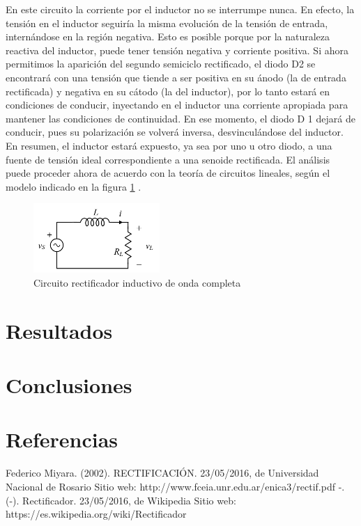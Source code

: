 \documentclass[a4paper,12pt]{article}
\begin{document}
\indent En este circuito la corriente por el inductor no se interrumpe nunca. En efecto, la tensión en el inductor seguiría la misma evolución de la tensión de entrada, internándose en la región negativa. Esto es posible porque por la naturaleza reactiva del inductor, puede tener tensión negativa y corriente positiva. Si ahora permitimos la aparición del segundo semiciclo rectificado, el diodo D2 se encontrará con una tensión que tiende a ser positiva en su ánodo (la de entrada rectificada) y negativa en su cátodo (la del inductor), por lo tanto estará en condiciones de conducir, inyectando en el inductor una corriente apropiada para mantener las condiciones de continuidad. En ese
momento, el diodo D 1 dejará de conducir, pues su polarización se volverá inversa, desvinculándose del inductor.\\

\indent En resumen, el inductor estará expuesto, ya sea por uno u otro diodo, a una fuente de tensión ideal correspondiente a una senoide rectificada. El análisis puede proceder ahora de acuerdo con la teoría de circuitos lineales, según el modelo indicado en la figura \ref{Figura6} .

\begin{figure}
  \begin{center}
    \includegraphics{images/Circuito_Inductivo_Lineal_Onda_Completa.png}
    \caption{Circuito rectificador inductivo de onda completa}
    \label{Figura6}
  \end{center}
\end{figure}

\section{Resultados}

\section{Conclusiones}

\section{Referencias}

\begin{thebibliography}{9}
Federico Miyara. (2002). RECTIFICACIÓN. 23/05/2016, de Universidad Nacional de Rosario Sitio web: http://www.fceia.unr.edu.ar/enica3/rectif.pdf
-. (-). Rectificador. 23/05/2016, de Wikipedia Sitio web: https://es.wikipedia.org/wiki/Rectificador
\end{thebibliography}
\end{document}
